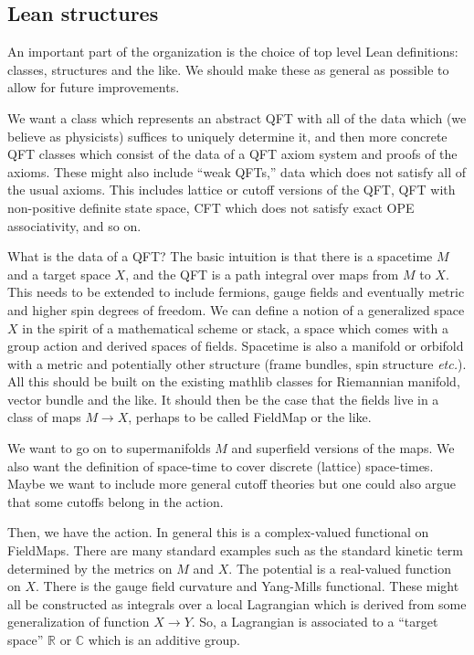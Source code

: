 \documentclass{article}
\newcommand{\1}{\mathbbm{1}}
\theoremstyle{plain}
\theoremstyle{definition}
\numberwithin{equation}{section}
\def\IC{\mathbb{C}}
\def\IR{\mathbb{R}}
\begin{document}
\subsection{Lean structures}

An important part of the organization is the choice of top level Lean definitions: classes, structures and the like.
We should make these as general as possible to allow for future improvements.

We want a class which represents an abstract QFT with all of the data which (we believe as physicists) suffices to uniquely determine it,
and then more concrete QFT classes which consist of the data of a QFT axiom system and proofs of the axioms.  These might also include ``weak QFTs,''
data which does not satisfy all of the usual axioms.  This includes lattice or cutoff versions of the QFT, QFT with non-positive definite state space,
CFT which does not satisfy exact OPE associativity, and so on.

What is the data of a QFT?  The basic intuition is that there is a spacetime $M$ and a target space $X$, and the QFT is a path integral
over maps from $M$ to $X$.  This needs to be extended to include fermions, gauge fields and eventually metric and higher spin degrees of freedom.
We can define a notion of a generalized space $X$ in the spirit of a mathematical scheme or stack, a space which comes with a group action
and derived spaces of fields.  Spacetime is also a manifold or orbifold with a metric and potentially other structure (frame bundles, spin structure {\it etc.}).
All this should be built on the existing mathlib classes for Riemannian manifold, vector bundle and the like.
It should then be the case that the fields live in a class of maps $M\rightarrow X$, perhaps to be called FieldMap or the like.

We want to go on to supermanifolds $M$ and superfield versions of the maps.  We also want the definition of space-time to cover
discrete (lattice) space-times.  Maybe we want to include more general cutoff theories but one could also argue that some cutoffs belong in the action.

Then, we have the action.  In general this is a complex-valued functional on FieldMaps.  There are many standard examples such as the
standard kinetic term determined by the metrics on $M$ and $X$.  The potential is a real-valued function on $X$.  There is the gauge field curvature
and Yang-Mills functional.  These might all be constructed as integrals over a local Lagrangian which is derived from some generalization of function $X\rightarrow Y$.
So, a Lagrangian is associated to a ``target space'' $\IR$ or $\IC$ which is an additive group.
\end{document}
